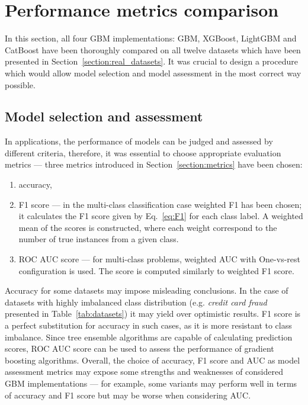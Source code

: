 \documentclass[magisterska, english]{pwr_wmat_praca_dyplomowa}
\theoremstyle{plain}
\numberwithin{theorem}{chapter}
\theoremstyle{definition}
\numberwithin{theorem}{chapter}
\begin{document}
\section{Performance metrics comparison}
In this section, all four GBM implementations: GBM, XGBoost, LightGBM and CatBoost have been thoroughly compared on all twelve datasets which have been presented in Section~\ref{section:real_datasets}. It was crucial to design a procedure which would allow model selection and model assessment in the most correct way possible.

\subsection{Model selection and assessment}\label{section:model_selection}
In applications, the performance of models can be judged and assessed by different criteria, therefore, it was essential to choose appropriate evaluation metrics --- three metrics introduced in Section~\ref{section:metrics} have been chosen:

\begin{enumerate}
    \item accuracy,
    \item F1 score --- in the multi-class classification case weighted F1 has been chosen; it calculates the F1 score given by Eq.~\eqref{eq:F1} for each class label. A weighted mean of the scores is constructed, where each weight correspond to the number of true instances from a given class.
    \item ROC AUC score --- for multi-class problems, weighted AUC with One-vs-rest configuration is used. The score is computed similarly to weighted F1 score.
\end{enumerate}

Accuracy for some datasets may impose misleading conclusions. In the case of datasets with highly imbalanced class distribution (e.g. \emph{credit card fraud} presented in Table~\ref{tab:datasets}) it may yield over optimistic results. F1 score is a perfect substitution for accuracy in such cases, as it is more resistant to class imbalance. Since tree ensemble algorithms are capable of calculating prediction scores, ROC AUC score can be used to assess the performance of gradient boosting algorithms. Overall, the choice of accuracy, F1 score and AUC as model assessment metrics may expose some strengths and weaknesses of considered GBM implementations --- for example, some variants may perform well in terms of accuracy and F1 score but may be worse when considering AUC.
\end{document}
